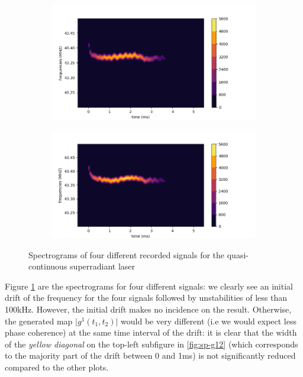 \documentclass[10pt]{report}
\begin{document}
\begin{figure}[h!]
\centering
\begin{subfigure}{.48\textwidth}
  \centering
  \includegraphics[width=1.1\linewidth]{spec3-44}
\end{subfigure}%
\hspace{1em}%
\begin{subfigure}{.48\textwidth}
  \centering
  \includegraphics[width=1.1\linewidth]{spec3-45}
\end{subfigure}
\caption{Spectrograms of four different recorded signals for the quasi-continuous superradiant laser}
\label{fig:spectrograms}
\end{figure}

Figure \ref{fig:spectrograms} are the spectrograms for four different signals: we clearly see an initial drift of the frequency for the four signals followed by unstabilities of less than 100kHz. However, the initial drift makes no incidence on the result. Otherwise, the generated map $\vert g^1(t_1, t_2) \vert$ would be very different (i.e we would expect less phase coherence) at the same time interval of the drift: it is clear that the width of the \textit{yellow diagonal} on the top-left subfigure in \ref{fig:sp-g12} (which corresponds to the majority part of the drift between 0 and 1ms) is not significantly reduced compared to the other plots.
\end{document}
